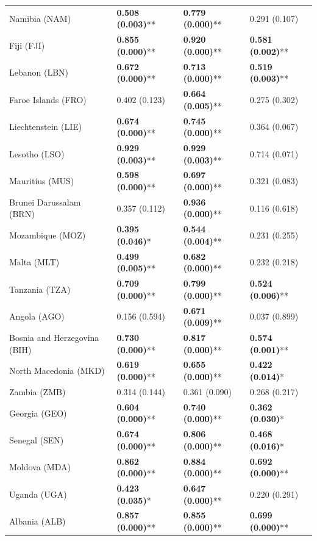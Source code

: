 \begin{longtable}{p{4cm}p{3cm}p{3cm}p{3cm}}
Namibia (NAM) & \textbf{0.508 (0.003)}** & \textbf{0.779 (0.000)}** & 0.291 (0.107) \\
Fiji (FJI) & \textbf{0.855 (0.000)}** & \textbf{0.920 (0.000)}** & \textbf{0.581 (0.002)}** \\
Lebanon (LBN) & \textbf{0.672 (0.000)}** & \textbf{0.713 (0.000)}** & \textbf{0.519 (0.003)}** \\
Faroe Islands (FRO) & 0.402 (0.123) & \textbf{0.664 (0.005)}** & 0.275 (0.302) \\
Liechtenstein (LIE) & \textbf{0.674 (0.000)}** & \textbf{0.745 (0.000)}** & 0.364 (0.067) \\
Lesotho (LSO) & \textbf{0.929 (0.003)}** & \textbf{0.929 (0.003)}** & 0.714 (0.071) \\
Mauritius (MUS) & \textbf{0.598 (0.000)}** & \textbf{0.697 (0.000)}** & 0.321 (0.083) \\
Brunei Darussalam (BRN) & 0.357 (0.112) & \textbf{0.936 (0.000)}** & 0.116 (0.618) \\
Mozambique (MOZ) & \textbf{0.395 (0.046)}* & \textbf{0.544 (0.004)}** & 0.231 (0.255) \\
Malta (MLT) & \textbf{0.499 (0.005)}** & \textbf{0.682 (0.000)}** & 0.232 (0.218) \\
Tanzania (TZA) & \textbf{0.709 (0.000)}** & \textbf{0.799 (0.000)}** & \textbf{0.524 (0.006)}** \\
Angola (AGO) & 0.156 (0.594) & \textbf{0.671 (0.009)}** & 0.037 (0.899) \\
Bosnia and Herzegovina (BIH) & \textbf{0.730 (0.000)}** & \textbf{0.817 (0.000)}** & \textbf{0.574 (0.001)}** \\
North Macedonia (MKD) & \textbf{0.619 (0.000)}** & \textbf{0.655 (0.000)}** & \textbf{0.422 (0.014)}* \\
Zambia (ZMB) & 0.314 (0.144) & 0.361 (0.090) & 0.268 (0.217) \\
Georgia (GEO) & \textbf{0.604 (0.000)}** & \textbf{0.740 (0.000)}** & \textbf{0.362 (0.030)}* \\
Senegal (SEN) & \textbf{0.674 (0.000)}** & \textbf{0.806 (0.000)}** & \textbf{0.468 (0.016)}* \\
Moldova (MDA) & \textbf{0.862 (0.000)}** & \textbf{0.884 (0.000)}** & \textbf{0.692 (0.000)}** \\
Uganda (UGA) & \textbf{0.423 (0.035)}* & \textbf{0.647 (0.000)}** & 0.220 (0.291) \\
Albania (ALB) & \textbf{0.857 (0.000)}** & \textbf{0.855 (0.000)}** & \textbf{0.699 (0.000)}** \\

\end{longtable}
